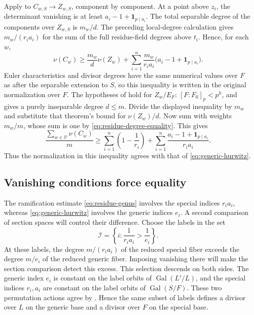 Apply  to $C_{w,S}\to Z_{w,S}$,
component by component. At a point above $z_i$, the determinant
vanishing is at least
$a_i-1+\mathbf 1_{p\mid a_i}$. The total separable degree of the
components over $Z_{w,S}$ is $m_w/d$. The preceding local-degree
calculation gives $m_w/(r_i a_i)$ for the sum of the full residue-field
degrees above $t_i$. Hence, for each $w$,
\[
 \nu(C_w)\geq\frac{m_w}{d}\nu(Z_w)
 +\sum_{i=1}^n\frac{m_w}{r_i a_i}
       \bigl(a_i-1+\mathbf 1_{p\mid a_i}\bigr).
\]
Euler characteristics and divisor degrees have the same numerical
values over $F$ as after the separable extension to $S$, so this
inequality is written in the original normalization over $F$.
The hypotheses of
 hold for $Z_w/E_F$:
$[F:F_0]_p<p^h$, and  gives
a purely inseparable degree $d\leq m$. Divide the displayed inequality
by $m_w$ and substitute that theorem's bound for $\nu(Z_w)/d$.
Now sum with weights $m_w/m$, whose sum is one by
\eqref{eq:residue-degree-equality}. This gives
\begin{equation}\label{eq:residue-genus}
 \frac{\sum_{w\in\mathcal V}\nu(C_w)}m
 \geq
 \sum_{i=1}^n\left(1-\frac1{r_i}\right)
 +\sum_{i=1}^n
   \frac{a_i-1+\mathbf 1_{p\mid a_i}}{r_i a_i}.
\end{equation}
Thus the normalization in this inequality agrees with that of
\eqref{eq:generic-hurwitz}.

\subsection{Vanishing conditions force equality}

The ramification estimate \eqref{eq:residue-genus} involves the
special indices $r_i a_i$, whereas \eqref{eq:generic-hurwitz}
involves the generic indices $e_i$. A second comparison of section
spaces will control their difference. Choose the labels in the set
\[
 \mathcal I=\left\{i:\frac1{r_i a_i}>\frac1{e_i}\right\}.
\]
At these labels, the degree $m/(r_i a_i)$ of the reduced special fiber
exceeds the degree $m/e_i$ of the reduced generic fiber. Imposing
vanishing there will make the section comparison detect this excess.
This selection descends on both sides. The generic index $e_i$ is
constant on the label orbits of $\operatorname{Gal}(L'/L)$, and the
special indices $r_i,a_i$ are constant on the label orbits of
$\operatorname{Gal}(S/F)$. These two permutation actions agree by
. Hence the same subset of labels
defines a divisor over $L$ on the generic base and a divisor over $F$
on the special base.

